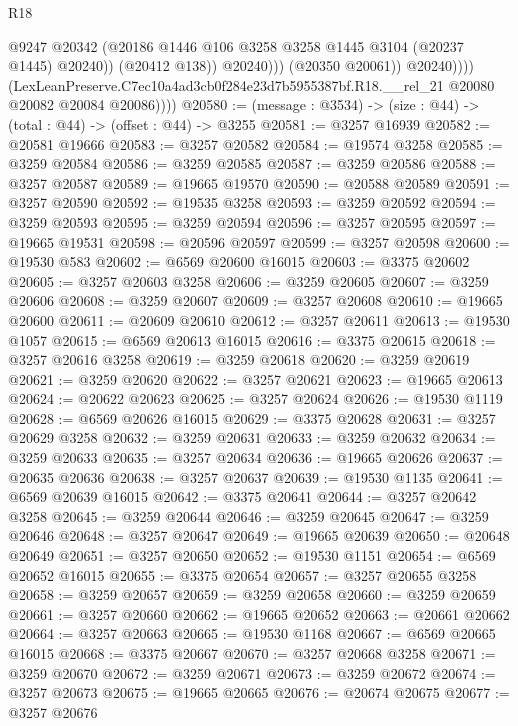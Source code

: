 \begin{lexlean}{R18}
\begin{coremodule}
                              @9247
                              @20342
                              (@20186 @1446 @106 @3258 @3258 @1445 @3104 (@20237 @1445) @20240))
                            (@20412 @138))
                          @20240)))
                    (@20350 @20061))
                  @20240))))
          (LexLeanPreserve.C7ec10a4ad3cb0f284e23d7b5955387bf.R18.__rel_21
            @20080
            @20082
            @20084
            @20086))))
@20580 := (message : @3534) -> (size : @44) -> (total : @44) -> (offset : @44) -> @3255
@20581 := @3257 @16939
@20582 := @20581 @19666
@20583 := @3257 @20582
@20584 := @19574 @3258
@20585 := @3259 @20584
@20586 := @3259 @20585
@20587 := @3259 @20586
@20588 := @3257 @20587
@20589 := @19665 @19570
@20590 := @20588 @20589
@20591 := @3257 @20590
@20592 := @19535 @3258
@20593 := @3259 @20592
@20594 := @3259 @20593
@20595 := @3259 @20594
@20596 := @3257 @20595
@20597 := @19665 @19531
@20598 := @20596 @20597
@20599 := @3257 @20598
@20600 := @19530 @583
@20602 := @6569 @20600 @16015
@20603 := @3375 @20602
@20605 := @3257 @20603 @3258
@20606 := @3259 @20605
@20607 := @3259 @20606
@20608 := @3259 @20607
@20609 := @3257 @20608
@20610 := @19665 @20600
@20611 := @20609 @20610
@20612 := @3257 @20611
@20613 := @19530 @1057
@20615 := @6569 @20613 @16015
@20616 := @3375 @20615
@20618 := @3257 @20616 @3258
@20619 := @3259 @20618
@20620 := @3259 @20619
@20621 := @3259 @20620
@20622 := @3257 @20621
@20623 := @19665 @20613
@20624 := @20622 @20623
@20625 := @3257 @20624
@20626 := @19530 @1119
@20628 := @6569 @20626 @16015
@20629 := @3375 @20628
@20631 := @3257 @20629 @3258
@20632 := @3259 @20631
@20633 := @3259 @20632
@20634 := @3259 @20633
@20635 := @3257 @20634
@20636 := @19665 @20626
@20637 := @20635 @20636
@20638 := @3257 @20637
@20639 := @19530 @1135
@20641 := @6569 @20639 @16015
@20642 := @3375 @20641
@20644 := @3257 @20642 @3258
@20645 := @3259 @20644
@20646 := @3259 @20645
@20647 := @3259 @20646
@20648 := @3257 @20647
@20649 := @19665 @20639
@20650 := @20648 @20649
@20651 := @3257 @20650
@20652 := @19530 @1151
@20654 := @6569 @20652 @16015
@20655 := @3375 @20654
@20657 := @3257 @20655 @3258
@20658 := @3259 @20657
@20659 := @3259 @20658
@20660 := @3259 @20659
@20661 := @3257 @20660
@20662 := @19665 @20652
@20663 := @20661 @20662
@20664 := @3257 @20663
@20665 := @19530 @1168
@20667 := @6569 @20665 @16015
@20668 := @3375 @20667
@20670 := @3257 @20668 @3258
@20671 := @3259 @20670
@20672 := @3259 @20671
@20673 := @3259 @20672
@20674 := @3257 @20673
@20675 := @19665 @20665
@20676 := @20674 @20675
@20677 := @3257 @20676

\end{coremodule}
\end{lexlean}
